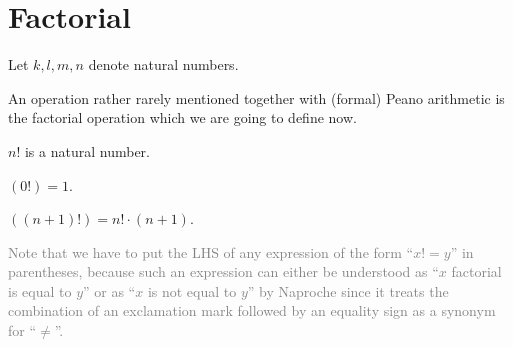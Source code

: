 \documentclass[../../arithmetic.ftl.tex]{subfiles}
\begin{document}
  \begin{comment}
    \begin{forthel}

    \end{forthel}
  \end{comment}


  \section{Factorial}

  \begin{forthel}
  \end{forthel}

  \begin{forthel}
    Let $k, l, m, n$ denote natural numbers.
  \end{forthel}

  An operation rather rarely mentioned together with (formal) Peano arithmetic
  is the factorial operation which we are going to define now.

  \begin{forthel}
    \begin{signature}
      $n!$ is a natural number.
    \end{signature}

    \begin{axiom}\label{Arithmetic_01_05_169222}
      $(0!) = 1$.
    \end{axiom}

    \begin{axiom}\label{Arithmetic_01_05_539010}
      $((n + 1)!) = n! \cdot (n + 1)$.
    \end{axiom}
  \end{forthel}

  \noindent \textcolor{gray}{Note that we have to put the LHS of any expression
  of the form \enquote{$x! = y$} in parentheses, because such an expression can
  either be understood as \enquote{$x$ factorial is equal to $y$} or as
  \enquote{$x$ is not equal to $y$} by Naproche since it treats the combination
  of an exclamation mark followed by an equality sign as a synonym for
  \enquote{$\neq$}.}
\end{document}
